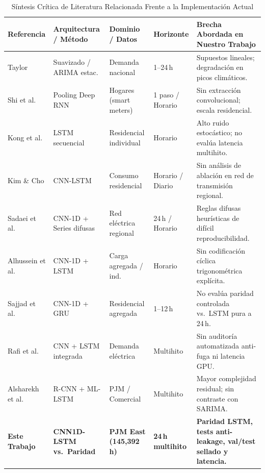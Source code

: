 \documentclass[conference]{IEEEtran}
\begin{document}
\begin{table}[t]
\centering
\caption{Síntesis Crítica de Literatura Relacionada Frente a la Implementación Actual}
\label{tab:estado_arte}
\footnotesize
\begin{tabularx}{\textwidth}{l p{2.9cm} p{2.6cm} p{2.3cm} p{4.6cm}}
\toprule
\textbf{Referencia} & \textbf{Arquitectura / Método} & \textbf{Dominio / Datos} & \textbf{Horizonte} & \textbf{Brecha Abordada en Nuestro Trabajo} \\
\midrule
Taylor \cite{taylor2003short} & Suavizado / ARIMA estac. & Demanda nacional & 1--24\,h & Supuestos lineales; degradación en picos climáticos. \\
Shi et al.\ \cite{shi2018deep} & Pooling Deep RNN & Hogares (smart meters) & 1 paso / Horario & Sin extracción convolucional; escala residencial. \\
Kong et al.\ \cite{kong2019short} & LSTM secuencial & Residencial individual & Horario & Alto ruido estocástico; no evalúa latencia multihito. \\
Kim \& Cho \cite{kim2019predicting} & CNN-LSTM & Consumo residencial & Horario / Diario & Sin análisis de ablación en red de transmisión regional. \\
Sadaei et al.\ \cite{sadaei2019short} & CNN-1D + Series difusas & Red eléctrica regional & 24\,h / Horario & Reglas difusas heurísticas de difícil reproducibilidad. \\
Alhussein et al.\ \cite{alhussein2020hybrid} & CNN-1D + LSTM & Carga agregada / ind. & Horario & Sin codificación cíclica trigonométrica explícita. \\
Sajjad et al.\ \cite{sajjad2020novel} & CNN-1D + GRU & Residencial agregada & 1--12\,h & No evalúa paridad controlada vs.\ LSTM pura a 24\,h. \\
Rafi et al.\ \cite{rafi2021short} & CNN + LSTM integrada & Demanda eléctrica & Multihito & Sin auditoría automatizada anti-fuga ni latencia GPU. \\
Alsharekh et al.\ \cite{alsharekh2022improving} & R-CNN + ML-LSTM & PJM / Comercial & Multihito & Mayor complejidad residual; sin contraste con SARIMA. \\
\midrule
\textbf{Este Trabajo} & \textbf{CNN1D-LSTM vs.\ Paridad} & \textbf{PJM East (145{,}392\,h)} & \textbf{24\,h multihito} & \textbf{Paridad LSTM, tests anti-leakage, val/test sellado y latencia.} \\
\bottomrule
\end{tabularx}
\end{table}
\end{document}

